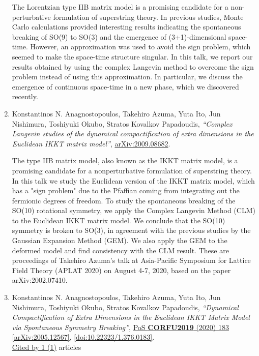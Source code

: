 \documentclass[a4paper,10pt]{article}
\begin{document}
\begin{enumerate}
The Lorentzian type IIB matrix model is a promising candidate for a non-perturbative formulation of superstring theory. In previous studies, Monte Carlo calculations provided interesting results indicating the spontaneous breaking of SO(9) to SO(3) and the emergence of (3+1)-dimensional space-time. However, an approximation was used to avoid the sign problem, which seemed to make the space-time structure singular. In this talk, we report our results obtained by using the complex Langevin method to overcome the sign problem instead of using this approximation. In particular, we discuss the emergence of continuous space-time in a new phase, which we discovered recently.
\item Konstantinos N. Anagnostopoulos, Takehiro Azuma, Yuta Ito, Jun Nishimura, Toshiyuki Okubo, Stratos Kovalkov Papadoudis, {\it ``Complex Langevin studies of the dynamical compactification of extra dimensions in the Euclidean IKKT matrix model''}, \href{https://arxiv.org/abs/2009.08682}{arXiv:2009.08682}.

The type IIB matrix model, also known as the IKKT matrix model, is a promising candidate for a nonperturbative formulation of superstring theory. In this talk we study the Euclidean version of the IKKT matrix model, which has a "sign problem" due to the Pfaffian coming from integrating out the fermionic degrees of freedom. To study the spontaneous breaking of the SO(10) rotational symmetry, we apply the Complex Langevin Method (CLM) to the Euclidean IKKT matrix model. We conclude that the SO(10) symmetry is broken to SO(3), in agreement with the previous studies by the Gaussian Expansion Method (GEM). We also apply the GEM to the deformed model and find consistency with the CLM result. These are proceedings of Takehiro Azuma's talk at Asia-Pacific Symposium for Lattice Field Theory (APLAT 2020) on August 4-7, 2020, based on the paper arXiv:2002.07410.
\item Konstantinos N. Anagnostopoulos, Takehiro Azuma, Yuta Ito, Jun Nishimura, Toshiyuki Okubo, Stratos Kovalkov Papadoudis, {\it ``Dynamical Compactification of Extra Dimensions in the Euclidean IKKT Matrix Model via Spontaneous Symmetry Breaking''}, \href{https://www.doi.org/10.22323/1.376.0183}{PoS {\bf CORFU2019} (2020) 183} \href{https://arxiv.org/abs/2005.12567}{[arXiv:2005.12567]}, \href{https://www.doi.org/10.22323/1.376.0183}{[doi:10.22323/1.376.0183]}.
\\\href{https://inspirehep.net/literature/?q=refersto%3Arecid%3A1797951}{Cited by 1 (1)} articles


\end{enumerate}
\end{document}
